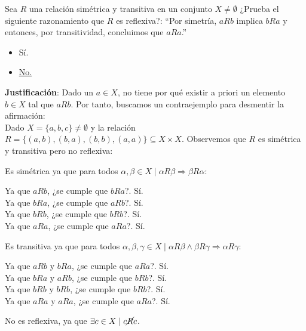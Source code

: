 \documentclass[12pt]{article}
\newcounter{ejercicio}[section] %
\newcounter{ejercicio}
\begin{document}
    \begin{ejercicio}
        Sea $R$ una relación simétrica y transitiva en un conjunto $X \neq \emptyset$ ¿Prueba el siguiente razonamiento que $R$ es reflexiva?:\newline
        ``Por simetría, $aRb$ implica $bRa$ y entonces, por transitividad, concluimos que $aRa$.''
        \begin{itemize}
            \item Sí.
            \item \underline{No.}
        \end{itemize}

        \noindent
        \textbf{Justificación}:
        Dado un $a \in X$, no tiene por qué existir a priori un elemento $b \in X$ tal que $aRb$. Por tanto, buscamos un contraejemplo para desmentir la afirmación:\\

        \noindent
        Dado $X = \{ a,b,c \} \neq \emptyset$ y la relación $R = \{ (a,b), (b,a), (b,b),(a,a) \} \subseteq X \times X$. \newline Observemos que $R$ es simétrica y transitiva pero no reflexiva:

        \noindent
        Es simétrica ya que para todos $\alpha, \beta \in X \mid \alpha R \beta \Rightarrow \beta R \alpha$:
        \begin{center}
            Ya que $aRb$, ¿se cumple que $bRa$?. Sí.\\
            Ya que $bRa$, ¿se cumple que $aRb$?. Sí.\\
            Ya que $bRb$, ¿se cumple que $bRb$?. Sí.\\
            Ya que $aRa$, ¿se cumple que $aRa$?. Sí.
        \end{center}
        Es transitiva ya que para todos $\alpha, \beta, \gamma \in X \mid \alpha R \beta \land \beta R \gamma \Rightarrow \alpha R \gamma$:
        \begin{center}
            Ya que $aRb$ y $bRa$, ¿se cumple que $aRa$?. Sí.\\
            Ya que $bRa$ y $aRb$, ¿se cumple que $bRb$?. Sí.\\
            Ya que $bRb$ y $bRb$, ¿se cumple que $bRb$?. Sí.\\
            Ya que $aRa$ y $aRa$, ¿se cumple que $aRa$?. Sí.
        \end{center}
        No es reflexiva, ya que $\exists c \in X \mid c\cancel{R}c$.
    \end{ejercicio}
\end{document}
